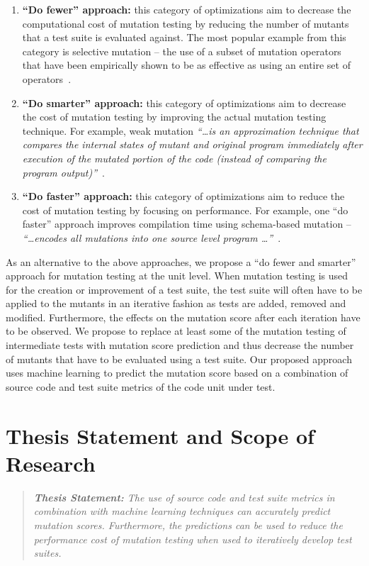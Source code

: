 \begin{enumerate}
  \item \textbf{``Do fewer'' approach:} this category of optimizations aim to decrease the computational cost of mutation testing by reducing the number of mutants that a test suite is evaluated against. The most popular example from this category is selective mutation -- the use of a subset of mutation operators that have been empirically shown to be as effective as using an entire set of operators~\cite{OLR+96}.

  \item \textbf{``Do smarter'' approach:} this category of optimizations aim to decrease the cost of mutation testing by improving the actual mutation testing technique. For example, weak mutation \emph{``\ldots is an approximation technique that compares the internal states of mutant and original program immediately after execution of the mutated portion of the code (instead of comparing the program output)''}~\cite{OU01}.

  \item \textbf{``Do faster'' approach:} this category of optimizations aim to reduce the cost of mutation testing by focusing on performance. For example, one ``do faster'' approach improves compilation time using schema-based mutation -- \emph{``\ldots encodes all mutations into one source level program \ldots''}~\cite{OU01}.
\end{enumerate}

As an alternative to the above approaches, we propose a ``do fewer and smarter'' approach for mutation testing at the unit level. When mutation testing is used for the creation or improvement of a test suite, the test suite will often have to be applied to the mutants in an iterative fashion as tests are added, removed and modified. Furthermore, the effects on the mutation score after each iteration have to be observed. We propose to replace at least some of the mutation testing of intermediate tests with mutation score prediction and thus decrease the number of mutants that have to be evaluated using a test suite. Our proposed approach uses machine learning to predict the mutation score based on a combination of source code and test suite metrics of the code unit under test.


\section{Thesis Statement and Scope of Research}
\label{sec:introduction_statement_and_scope}
\begin{quote}
  \emph{\textbf{Thesis Statement:} The use of source code and test suite metrics in combination with machine learning techniques can accurately predict mutation scores. Furthermore, the predictions can be used to reduce the performance cost of mutation testing when used to iteratively develop test suites.}
\end{quote}

